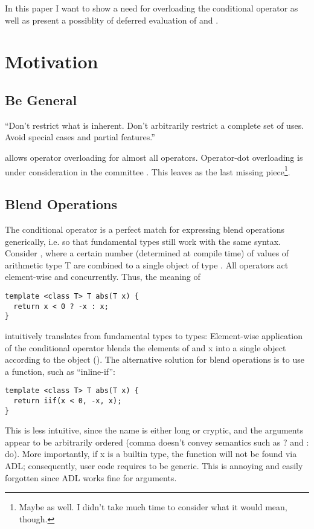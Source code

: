 In this paper I want to show a need for overloading the conditional operator as well as present a possiblity of deferred evaluation of  and .

\section{Motivation}
\subsection{Be General}
“Don’t restrict what is inherent.
Don’t arbitrarily restrict a complete set of uses.
Avoid special cases and partial features.” \cite{P0745R0}

\CC{} allows operator overloading for almost all operators.
Operator-dot overloading is under consideration in the committee \cite{P0352R1,P0416R1}.
This leaves  as the last missing piece\footnote{Maybe  as well. I didn't take much time to consider what it would mean, though.}.

\subsection{Blend Operations}
The conditional operator is a perfect match for expressing blend operations generically, i.e. so that fundamental types still work with the same syntax.
Consider \cite{N4744}, where a certain number (determined at compile time) of values of arithmetic type \type T are combined to a single object of type .
All operators act element-wise and concurrently.
Thus, the meaning of
\smallskip\begin{lstlisting}[style=Vc]
template <class T> T abs(T x) {
  return x < 0 ? -x : x;
}
\end{lstlisting}
intuitively translates from fundamental types to  types:
Element-wise application of the conditional operator blends the elements of  and \code x into a single  object according to the  object ().
The alternative solution for  blend operations is to use a function, such as “inline-if”:
\smallskip\begin{lstlisting}[style=Vc]
template <class T> T abs(T x) {
  return iif(x < 0, -x, x);
}
\end{lstlisting}
This is less intuitive, since the name is either long or cryptic, and the arguments appear to be arbitrarily ordered (comma doesn't convey semantics such as \code ? and \code : do).
More importantly, if \code x is a builtin type, the function will not be found via ADL; consequently, user code requires  to be generic.
This is annoying and easily forgotten since ADL works fine for  arguments.


